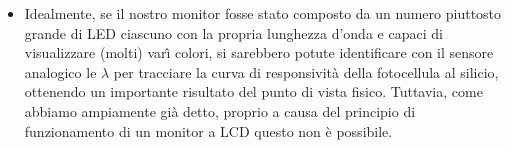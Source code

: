 \documentclass[10pt,letterpaper]{article}
\begin{document}
\begin{itemize}
Si riporta in Figura (\ref{modello_quad}) il grafico del modello teorico quadratico (normalizzato e non) con i punti sperimentali acquisiti.

\begin{figure}
\centering
{}
{}

\caption{}
\label{modello_quad}
\end{figure}


\item Idealmente, se il nostro monitor fosse stato composto da un numero piuttosto grande di LED ciascuno con la propria lunghezza d'onda e capaci di visualizzare (molti) var\^{\i} colori, si sarebbero potute identificare con il sensore analogico le $\lambda$ per tracciare la curva di responsività della fotocellula al silicio, ottenendo un importante risultato del punto di vista fisico. Tuttavia, come abbiamo ampiamente già detto, proprio a causa del principio di funzionamento di un monitor a LCD questo non è possibile. 

\end{itemize} 
\end{document}
